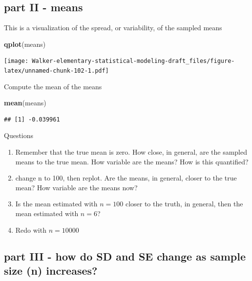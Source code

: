 \documentclass[]{book}
\newenvironment{Shaded}{\begin{snugshade}}{\end{snugshade}}
\newcommand{\KeywordTok}[1]{\textcolor[rgb]{0.13,0.29,0.53}{\textbf{#1}}}
\newcommand{\NormalTok}[1]{#1}
\providecommand{\tightlist}{%
  \setlength{\itemsep}{0pt}\setlength{\parskip}{0pt}}
\begin{document}
\hypertarget{part-ii---means}{%
\subsection{part II - means}\label{part-ii---means}}

This is a visualization of the spread, or variability, of the sampled means

\begin{Shaded}
\begin{Highlighting}[]
\KeywordTok{qplot}\NormalTok{(means)}
\end{Highlighting}
\end{Shaded}

\texttt{[image: Walker-elementary-statistical-modeling-draft\_files/figure-latex/unnamed-chunk-102-1.pdf]}

Compute the mean of the means

\begin{Shaded}
\begin{Highlighting}[]
\KeywordTok{mean}\NormalTok{(means)}
\end{Highlighting}
\end{Shaded}

\begin{verbatim}
## [1] -0.039961
\end{verbatim}

Questions

\begin{enumerate}
\def\labelenumi{\arabic{enumi}.}
\tightlist
\item
  Remember that the true mean is zero. How close, in general, are the sampled means to the true mean. How variable are the means? How is this quantified?
\item
  change n to 100, then replot. Are the means, in general, closer to the true mean? How variable are the means now?
\item
  Is the mean estimated with \(n=100\) closer to the truth, in general, then the mean estimated with \(n=6\)?
\item
  Redo with \(n=10000\)
\end{enumerate}

\hypertarget{part-iii---how-do-sd-and-se-change-as-sample-size-n-increases}{%
\subsection{part III - how do SD and SE change as sample size (n) increases?}\label{part-iii---how-do-sd-and-se-change-as-sample-size-n-increases}}
\end{document}

